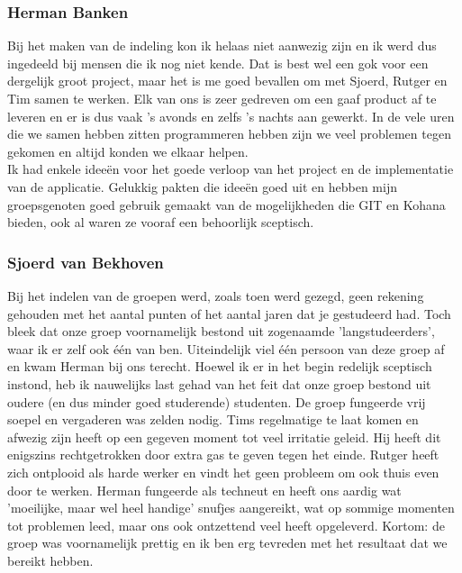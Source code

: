 \documentclass[a4paper,10pt]{article}
\begin{document}
		\subsubsection{Herman Banken}
		Bij het maken van de indeling kon ik helaas niet aanwezig zijn en ik werd dus ingedeeld bij mensen die ik nog niet kende. Dat is best wel een gok voor een dergelijk groot project, maar het is me goed bevallen om met Sjoerd, Rutger en Tim samen te werken. Elk van ons is zeer gedreven om een gaaf product af te leveren en er is dus vaak 's avonds en zelfs 's nachts aan gewerkt. In de vele uren die we samen hebben zitten programmeren hebben zijn we veel problemen tegen gekomen en altijd konden we elkaar helpen.\\
		Ik had enkele idee\"en voor het goede verloop van het project en de implementatie van de applicatie. Gelukkig pakten die idee\"en goed uit en hebben mijn groepsgenoten goed gebruik gemaakt van de mogelijkheden die GIT en Kohana bieden, ook al waren ze vooraf een behoorlijk sceptisch.
		
		\subsubsection{Sjoerd van Bekhoven}
		Bij het indelen van de groepen werd, zoals toen werd gezegd, geen rekening gehouden met het aantal punten of het aantal jaren dat je gestudeerd had. Toch bleek dat onze groep voornamelijk bestond uit zogenaamde 'langstudeerders', waar ik er zelf ook \'e\'en van ben. Uiteindelijk viel \'e\'en persoon van deze groep af en kwam Herman bij ons terecht. Hoewel ik er in het begin redelijk sceptisch instond, heb ik nauwelijks last gehad van het feit dat onze groep bestond uit oudere (en dus minder goed studerende) studenten. De groep fungeerde vrij soepel en vergaderen was zelden nodig. Tims regelmatige te laat komen en afwezig zijn heeft op een gegeven moment tot veel irritatie geleid. Hij heeft dit enigszins rechtgetrokken door extra gas te geven tegen het einde. Rutger heeft zich ontplooid als harde werker en vindt het geen probleem om ook thuis even door te werken. Herman fungeerde als techneut en heeft ons aardig wat 'moeilijke, maar wel heel handige' snufjes aangereikt, wat op sommige momenten tot problemen leed, maar ons ook ontzettend veel heeft opgeleverd. Kortom: de groep was voornamelijk prettig en ik ben erg tevreden met het resultaat dat we bereikt hebben.
		
\end{document}
